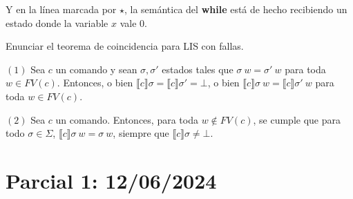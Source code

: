 \documentclass[a4paper, 12pt]{article}
\begin{document}
Y en la línea marcada por $\star$, la semántica del \textbf{while} está de
hecho recibiendo un estado donde la variable $x$ vale $0$.

\pagebreak 

\begin{myframe}
  Enunciar el teorema de coincidencia para LIS con fallas.
\end{myframe}

$(1)$ Sea $c$ un comando y sean $\sigma, \sigma'$ estados tales que $\sigma ~ w =
\sigma' ~ w$ para toda $w \in FV(c)$. Entonces, o bien $\llbracket c \rrbracket
\sigma = \llbracket c \rrbracket\sigma' = \bot $, o bien $\llbracket c
\rrbracket\sigma ~ w = \llbracket c \rrbracket\sigma' ~ w$ para toda $w \in
FV(c)$.

$(2)$ Sea $c$ un comando. Entonces, para toda $w \not\in FV(c)$, se cumple que
para todo $\sigma \in \Sigma$, $\llbracket c \rrbracket\sigma ~ w = \sigma ~ w$,
siempre que $\llbracket c \rrbracket\sigma \neq \bot $.

\pagebreak 

\section{Parcial 1: 12/06/2024}
\end{document}
